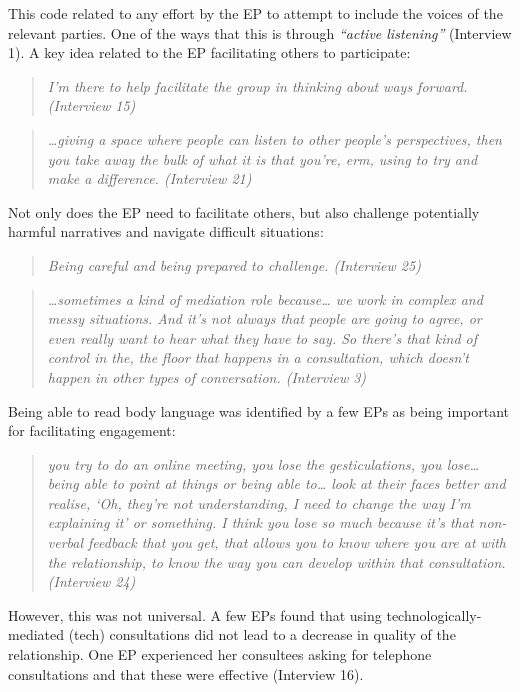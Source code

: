 \documentclass[
  english,
  man]{apa}
\begin{document}
This code related to any effort by the EP to attempt to include the voices of the relevant parties. One of the ways that this is through \emph{``active listening''} (Interview 1). A key idea related to the EP facilitating others to participate:

\begin{quote}
\emph{I'm there to help facilitate the group in thinking about ways
forward. (Interview 15)}
\end{quote}

\begin{quote}
\emph{\ldots giving a space where people can listen to other people's
perspectives, then you take away the bulk of what it is that you're,
erm, using to try and make a difference. (Interview 21)}
\end{quote}

Not only does the EP need to facilitate others, but also challenge
potentially harmful narratives and navigate difficult situations:

\begin{quote}
\emph{Being careful and being prepared to challenge. (Interview 25)}
\end{quote}

\begin{quote}
\emph{\ldots sometimes a kind of mediation role because\ldots{} we work in complex
and messy situations. And it's not always that people are going to
agree, or even really want to hear what they have to say. So there's
that kind of control in the, the floor that happens in a consultation,
which doesn't happen in other types of conversation. (Interview 3)}
\end{quote}

Being able to read body language was identified by a few EPs as being
important for facilitating engagement:

\begin{quote}
\emph{you try to do an online meeting, you lose the gesticulations, you
lose\ldots{} being able to point at things or being able to\ldots{} look at their faces better and realise, `Oh, they're not
understanding, I need to change the way I'm explaining it' or
something. I think you lose so much because it's that non-verbal
feedback that you get, that allows you to know where you are at with
the relationship, to know the way you can develop within that
consultation. (Interview 24)}
\end{quote}

However, this was not universal. A few EPs found that using technologically-mediated (tech) consultations did not lead to a decrease in quality of the relationship. One EP experienced her consultees asking for telephone consultations and that these were effective (Interview 16).
\end{document}
